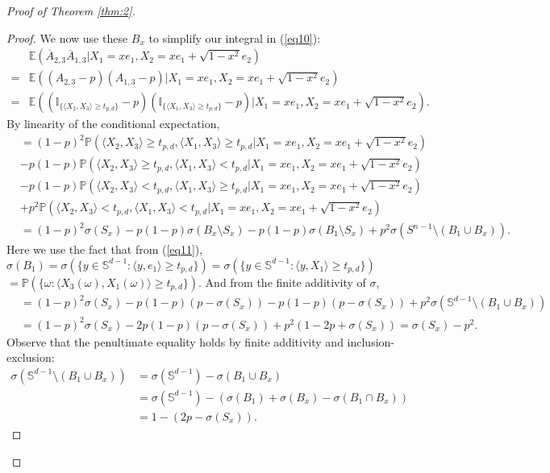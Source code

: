 \documentclass{article}
\begin{document}
\begin{proof}[Proof of Theorem \ref{thm:2}]
\begin{proof}
We now use these $B_x$ to simplify our integral in (\ref{eq10}):
\begin{align*}
    &\mathbb{E}\left(\overline{A}_{2,3}\overline{A}_{1,3} | X_1 = xe_1, X_2 = xe_1 + \sqrt{1-x^2}e_2\right)\\
    = &\mathbb{E}\left((A_{2,3} - p)(A_{1,3} - p) | X_1 = xe_1, X_2 = xe_1 + \sqrt{1-x^2}e_2\right)\\
    = &\mathbb{E}\left(\left(\mathbb{I}_{\{\langle X_2,X_3 \rangle \geq t_{p,d}\}} - p \right) \left(\mathbb{I}_{\{\langle X_1,X_3 \rangle \geq t_{p,d}\}} - p \right) | X_1 = xe_1, X_2 = xe_1 + \sqrt{1-x^2}e_2\right).
\end{align*}
By linearity of the conditional expectation,
\begin{align*}
    &= (1-p)^2\mathbb{P}\left(\langle X_2,X_3 \rangle \geq t_{p,d}, \langle X_1, X_3 \rangle \geq t_{p,d} | X_1 = xe_1, X_2 = xe_1 + \sqrt{1-x^2}e_2\right)\\ 
    &-p(1-p)\mathbb{P}\left(\langle X_2,X_3 \rangle \geq t_{p,d}, \langle X_1,X_3 \rangle < t_{p,d}| X_1 = xe_1, X_2 = xe_1 + \sqrt{1-x^2}e_2\right)\\
    &-p(1-p)\mathbb{P}\left(\langle X_2,X_3 \rangle < t_{p,d}, \langle X_1,X_3 \rangle \geq t_{p,d}| X_1 = xe_1, X_2 = xe_1 + \sqrt{1-x^2}e_2\right)\\
    &+ p^2\mathbb{P}\left(\langle X_2,X_3 \rangle < t_{p,d}, \langle X_1,X_3 \rangle < t_{p,d}| X_1 = xe_1, X_2 = xe_1 + \sqrt{1-x^2}e_2\right)\\
    &= (1-p)^2\sigma(S_x) -p(1-p)\sigma(B_x \setminus S_x) -p(1-p)\sigma(B_1 \setminus S_x) + p^2 \sigma(S^{n-1} \setminus \left(B_1 \cup B_x\right)).
\end{align*}
Here we use the fact that from (\ref{eq11}),  $\sigma(B_1) = \sigma(\{ y \in \mathbb{S}^{d-1} : \langle y,  e_1 \rangle \geq t_{p,d} \}) = \sigma(\{ y \in \mathbb{S}^{d-1} : \langle y, X_1 \rangle \geq t_{p,d} \})$\\ $= \mathbb{P}(\{ \omega: \langle X_3(\omega), X_1(\omega) \rangle \geq t_{p,d} \})$. And from the finite additivity of $\sigma$, 
\begin{align*}
    &= (1-p)^2\sigma(S_x) -p(1-p)(p - \sigma(S_x)) - p(1-p)(p - \sigma(S_x)) + p^2 \sigma(\mathbb{S}^{d-1} \setminus \left(B_1 \cup B_x\right))\\
    &= (1-p)^2\sigma(S_x) -2p(1-p)(p - \sigma(S_x)) + p^2(1 - 2p + \sigma(S_x)) = \sigma(S_x) - p^2.
\end{align*}
Observe that the penultimate equality holds by finite additivity and inclusion-exclusion:
\begin{align*}
    \sigma(\mathbb{S}^{d-1} \setminus \left(B_1 \cup B_x\right)) &= \sigma(\mathbb{S}^{d-1}) - \sigma(B_1 \cup B_x)\\
    &= \sigma(\mathbb{S}^{d-1}) - \left( \sigma(B_1) + \sigma(B_x) - \sigma(B_1 \cap B_x) \right)\\
    &= 1 - (2p - \sigma(S_x)).
\end{align*}


\end{proof}
\end{proof}
\end{document}
